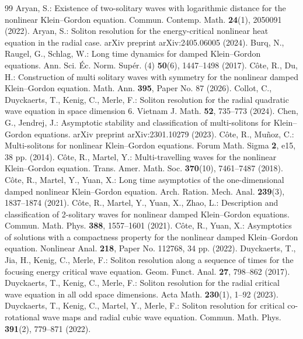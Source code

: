 \documentclass[10pt,a4paper]{amsart}
\numberwithin{equation}{section}
\begin{document}
\begin{thebibliography}{99}
 Aryan, S.: Existence of two-solitary waves with logarithmic distance for the nonlinear Klein--Gordon equation. Commun. Contemp. Math. \textbf{24}(1), 2050091 (2022).
 Aryan, S.: Soliton resolution for the energy-critical nonlinear heat equation in the radial case. arXiv preprint arXiv:2405.06005 (2024).
 Burq, N., Raugel, G., Schlag, W.: Long time dynamics for damped Klein--Gordon equations. Ann. Sci. \'Ec. Norm. Sup\'er. (4) \textbf{50}(6), 1447--1498 (2017).
 C\^ote, R., Du, H.: Construction of multi solitary waves with symmetry for the nonlinear damped Klein--Gordon equation. Math. Ann. \textbf{395}, Paper No. 87 (2026).
 Collot, C., Duyckaerts, T., Kenig, C., Merle, F.: Soliton resolution for the radial quadratic wave equation in space dimension 6. Vietnam J. Math. \textbf{52}, 735--773 (2024).
 Chen, G., Jendrej, J.: Asymptotic stability and classification of multi-solitons for Klein--Gordon equations. arXiv preprint arXiv:2301.10279 (2023).
 C\^ote, R., Mu\~noz, C.: Multi-solitons for nonlinear Klein--Gordon equations. Forum Math. Sigma \textbf{2}, e15, 38 pp. (2014).
 C\^ote, R., Martel, Y.: Multi-travelling waves for the nonlinear Klein--Gordon equation. Trans. Amer. Math. Soc. \textbf{370}(10), 7461--7487 (2018).
 C\^ote, R., Martel, Y., Yuan, X.: Long time asymptotics of the one-dimensional damped nonlinear Klein--Gordon equation. Arch. Ration. Mech. Anal. \textbf{239}(3), 1837--1874 (2021).
 C\^ote, R., Martel, Y., Yuan, X., Zhao, L.: Description and classification of 2-solitary waves for nonlinear damped Klein--Gordon equations. Commun. Math. Phys. \textbf{388}, 1557--1601 (2021).
 C\^ote, R., Yuan, X.: Asymptotics of solutions with a compactness property for the nonlinear damped Klein--Gordon equation. Nonlinear Anal. \textbf{218}, Paper No. 112768, 34 pp. (2022).
 Duyckaerts, T., Jia, H., Kenig, C., Merle, F.: Soliton resolution along a sequence of times for the focusing energy critical wave equation. Geom. Funct. Anal. \textbf{27}, 798--862 (2017).
 Duyckaerts, T., Kenig, C., Merle, F.: Soliton resolution for the radial critical wave equation in all odd space dimensions. Acta Math. \textbf{230}(1), 1--92 (2023).
 Duyckaerts, T., Kenig, C., Martel, Y., Merle, F.: Soliton resolution for critical co-rotational wave maps and radial cubic wave equation. Commun. Math. Phys. \textbf{391}(2), 779--871 (2022).

\end{thebibliography}
\end{document}
